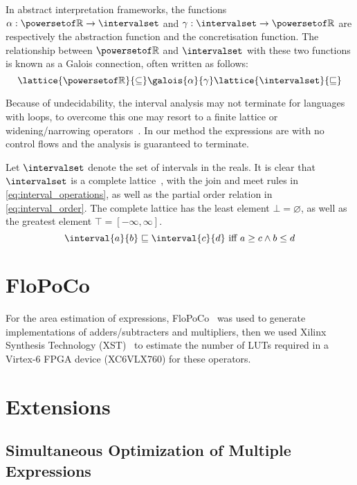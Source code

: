 In abstract interpretation frameworks, the functions $\alpha:
\powersetof\realset \to \intervalset$ and $\gamma: \intervalset \to
\powersetof\realset$ are respectively the abstraction function and the
concretisation function. The relationship between $\powersetof\realset$ and
$\intervalset$ with these two functions is known as a Galois connection, often
written as follows:
\begin{equation}
    \lattice{\powersetof\realset}{\subseteq}
    \galois{\alpha}{\gamma}
    \lattice{\intervalset}{\sqsubseteq}
\end{equation}

Because of undecidability, the interval analysis may not terminate for
languages with loops, to overcome this one may resort to a finite lattice or
widening/narrowing operators~\cite{basic_absint}. In our method the expressions
are with no control flows and the analysis is guaranteed to terminate.

Let $\intervalset$ denote the set of intervals in the reals. It is clear that
$\intervalset$ is a complete lattice~\cite{nielson}, with the join and meet
rules in \eqref{eq:interval_operations}, as well as the partial order relation
in \eqref{eq:interval_order}. The complete lattice has the least element $\bot
= \varnothing$, as well as the greatest element $\top = \left[ -\infty, \infty
\right]$.
\begin{equation}
    \interval{a}{b} \sqsubseteq \interval{c}{d}
    \text{~iff~}
    a \geq c \wedge b \leq d
    \label{eq:interval_order}
\end{equation}

\section{FloPoCo}

For the area estimation of expressions, FloPoCo~\cite{flopoco} was used to
generate implementations of adders/subtracters and multipliers, then we used
Xilinx Synthesis Technology (XST)~\cite{xst} to estimate the number of LUTs
required in a Virtex-6 FPGA device (XC6VLX760) for these operators.


\section{Extensions}
\label{sub:extensions}

\subsection{Simultaneous Optimization of Multiple Expressions}

